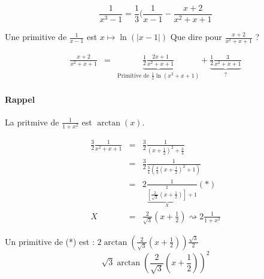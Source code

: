 								\[\frac{1}{x^3 -1} = \frac{1}{3}(\frac{1}{x-1} - \frac{x+2}{x^2 +x + 1}\]

Une primitive de $\frac{1}{x-1}$ est $x \mapsto \ln(|x-1|)$
Que dire pour $\frac{x+2}{x^2 + x + 1}$ ? 

\[\begin{array}{rcl}
\frac{x+2}{x^2 + x + 1} &=& \underbrace{\frac{1}{2}\frac{2x+1}{x^2 + x + 1}}_{\text{Primitive de } \frac{1}{2} \ln(x^2 + x + 1)} + \underbrace{\frac{1}{2} \frac{3}{x^2 + x + 1} }_{\text{?}}\end{array}\]

		\paragraph{Rappel} La pritmive de $\frac{1}{1+x^2}$ est $\arctan (x)$.

		\[\begin{array}{rcl}
				\frac{3}{2}\frac{1}{x^2 + x + 1} &=& \frac{3}{2}\frac{1}{(x+\frac{1}{2})^2 + \frac{3}{4}} \\
									   &=& \frac{3}{2} \frac{1}{\frac{3}{4}(\frac{4}{3}(x+\frac{1}{2})^2 + 1)} \\
									   &=& 2\frac{1}{\underbrace{[\frac{2}{\sqrt{3}}(x+\frac{1}{2})]}_{X}^2 + 1} (*)\\
				X &=& \frac{2}{\sqrt{3}}(x+\frac{1}{2}) \rightsquigarrow 2\frac{1}{1+x^2}
		\end{array}\]

		Un primitive de (*) est : $2\arctan (\frac{2}{\sqrt{3}}(x+\frac{1}{2})) \frac{\sqrt{3}}{2}$ ~\\
		\[\sqrt{3}\arctan(\frac{2}{\sqrt{3}}(x+\frac{1}{2}))^2\]
